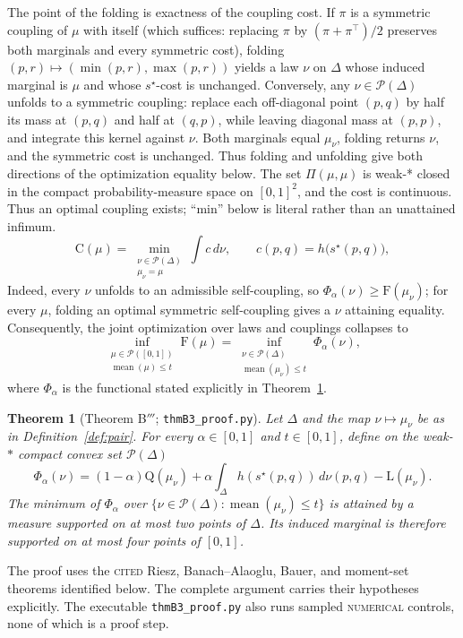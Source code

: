 \documentclass[11pt]{article}
\theoremstyle{plain}
\newtheorem{theorem}{Theorem}[section]
\theoremstyle{definition}
\theoremstyle{remark}
\DeclareMathOperator{\mean}{mean}
\newcommand{\PP}{\mathcal P}
\newcommand{\DD}{\Delta}
\newcommand{\sstar}{s^{\star}}
\newcommand{\Lb}{\mathrm{L}}
\newcommand{\Cc}{\mathrm{C}}
\newcommand{\Qq}{\mathrm{Q}}
\newcommand{\Ff}{\mathrm{F}}
\newcommand{\CITED}{\textsc{cited}}
\newcommand{\NUMERICAL}{\textsc{numerical}}
\begin{document}
The point of the folding is exactness of the coupling cost. If $\pi$ is a
symmetric coupling of $\mu$ with itself (which suffices: replacing $\pi$ by
$(\pi+\pi^{\top})/2$ preserves both marginals and every symmetric cost), folding
$(p,r)\mapsto(\min(p,r),\max(p,r))$ yields a law $\nu$ on $\DD$ whose
induced marginal is $\mu$ and whose $\sstar$-cost is unchanged.
Conversely, any \(\nu\in\PP(\DD)\) unfolds to a symmetric coupling:
replace each off-diagonal point \((p,q)\) by half its mass at \((p,q)\)
and half at \((q,p)\), while leaving diagonal mass at \((p,p)\), and integrate
this kernel against \(\nu\).  Both marginals equal \(\mu_\nu\), folding returns
\(\nu\), and the symmetric cost is unchanged.  Thus folding and unfolding give
both directions of the optimization equality below.
The set \(\Pi(\mu,\mu)\) is weak-* closed in the compact probability-measure
space on \([0,1]^2\), and the cost is continuous.  Thus an optimal coupling
exists; ``min'' below is literal rather than an unattained infimum.
\[
\Cc(\mu)=\min_{\substack{\nu\in\PP(\DD)\\\mu_\nu=\mu}}\int c\,d\nu,\qquad
c(p,q)=h\bigl(\sstar(p,q)\bigr),
\]
Indeed, every \(\nu\) unfolds to an admissible self-coupling, so
\(\Phi_\alpha(\nu)\ge\Ff(\mu_\nu)\); for every \(\mu\), folding an optimal
symmetric self-coupling gives a \(\nu\) attaining equality.
Consequently, the joint optimization over laws and couplings collapses to
\[
\inf_{\substack{\mu\in\PP([0,1])\\\mean(\mu)\le t}}\Ff(\mu)
=
\inf_{\substack{\nu\in\PP(\DD)\\\mean(\mu_\nu)\le t}}\Phi_\alpha(\nu),
\]
where $\Phi_\alpha$ is the functional stated explicitly in
Theorem~\ref{thm:B3}.

\begin{theorem}[Theorem B${}'''$; \texttt{thmB3\_proof.py}]
\label{thm:B3}
Let $\DD$ and the map $\nu\mapsto\mu_\nu$ be as in
Definition~\ref{def:pair}.  For every $\alpha\in[0,1]$ and $t\in[0,1]$,
define on the weak-$*$ compact convex set $\PP(\DD)$
\[
\Phi_\alpha(\nu)
=(1-\alpha)\Qq(\mu_\nu)
+\alpha\int_{\DD}h(\sstar(p,q))\,d\nu(p,q)-\Lb(\mu_\nu).
\]
The minimum of $\Phi_\alpha$ over
$\{\nu\in\PP(\DD):\mean(\mu_\nu)\le t\}$ is attained by a measure supported
on at most two points of $\DD$.  Its induced marginal is therefore supported
on at most four points of $[0,1]$.
\end{theorem}

The proof uses the \CITED{} Riesz, Banach--Alaoglu, Bauer, and moment-set
theorems identified below.  The complete argument carries their hypotheses
explicitly.  The executable \texttt{thmB3\_proof.py} also runs sampled
\NUMERICAL{} controls, none of which is a proof step.
\end{document}
